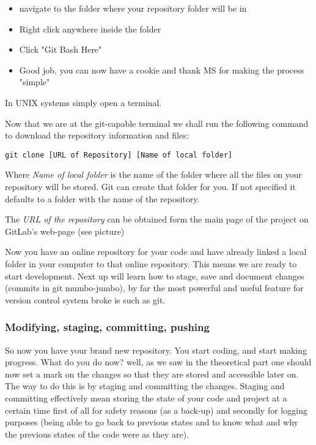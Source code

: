 \documentclass[runningheads,a4paper]{llncs}
\begin{document}
\begin{itemize}
    \item{navigate to the folder where your repository folder will be in}
    \item{Right click anywhere inside the folder}
    \item{Click "Git Bash Here"}
    \item{Good job, you can now have a cookie and thank MS for making the process "simple"}
\end{itemize}

In UNIX systems simply open a terminal.

Now that we are at the git-capable terminal we shall run the following command to download the repository information and files:\newline

\texttt{git clone [URL of Repository] [Name of local folder]}\newline

Where \textit{Name of local folder} is the name of the folder where all the files on your repository will be stored. Git can create that folder for you. If not specified it defaults to a folder with the name of the repository.

The \textit{URL of the repository} can be obtained form the main page of the project on GitLab's web-page (see picture)

Now you have an online repository for your code and have already linked a local folder in your computer to that online repository. This means we are ready to start development. Next up will learn how to stage, save and document changes (commits in git mumbo-jumbo), by far the most powerful and useful feature for version control system broke is such as git.


\subsubsection{Modifying, staging, committing, pushing}

So now you have your brand new repository. You start coding, and start making progress. What do you do now? well, as we saw in the theoretical part one should now set a mark on the changes so that they are stored and accessible later on. The way to do this is by staging and committing the changes. Staging and committing effectively mean storing the state of your code and project at a certain time first of all for safety reasons (as a back-up) and secondly for logging purposes (being able to go back to previous states and to know what and why the previous states of the code were as they are).
\end{document}
